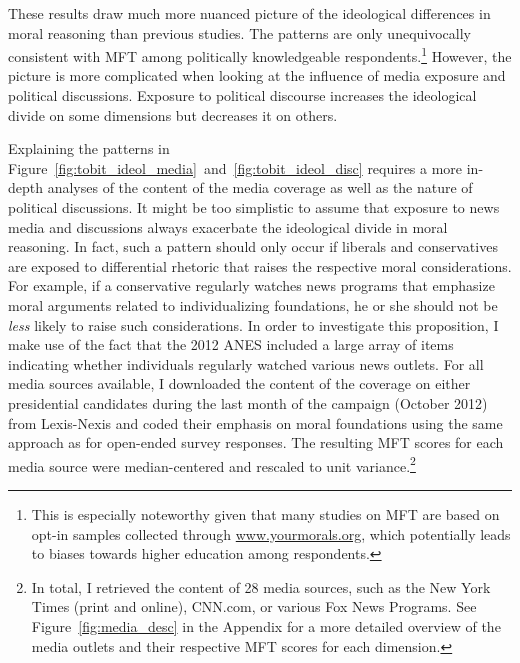 \documentclass[12pt]{article}
\begin{document}
These results draw much more nuanced picture of the ideological differences in moral reasoning than previous studies. The patterns are only unequivocally consistent with MFT among politically knowledgeable respondents.\footnote{This is especially noteworthy given that many studies on MFT are based on opt-in samples collected through \url{www.yourmorals.org}, which potentially leads to biases towards higher education among respondents.} However, the picture is more complicated when looking at the influence of media exposure and political discussions. Exposure to political discourse increases the ideological divide on some dimensions but decreases it on others.

Explaining the patterns in Figure~\ref{fig:tobit_ideol_media}~and~\ref{fig:tobit_ideol_disc} requires a more in-depth analyses of the content of the media coverage as well as the nature of political discussions. It might be too simplistic to assume that exposure to news media and discussions always exacerbate the ideological divide in moral reasoning. In fact, such a pattern should only occur if liberals and conservatives are exposed to differential rhetoric that raises the respective moral considerations. For example, if a conservative regularly watches news programs that emphasize moral arguments related to individualizing foundations, he or she should not be \textit{less} likely to raise such considerations. In order to investigate this proposition, I make use of the fact that the 2012 ANES included a large array of items indicating whether individuals regularly watched various news outlets. For all media sources available, I downloaded the content of the coverage on either presidential candidates during the last month of the campaign (October 2012) from Lexis-Nexis and coded their emphasis on moral foundations using the same approach as for open-ended survey responses. The resulting MFT scores for each media source were median-centered and rescaled to unit variance.\footnote{In total, I retrieved the content of 28 media sources, such as the New York Times (print and online), CNN.com, or various Fox News Programs. See Figure~\ref{fig:media_desc} in the Appendix for a more detailed overview of the media outlets and their respective MFT scores for each dimension.} 
\end{document}
